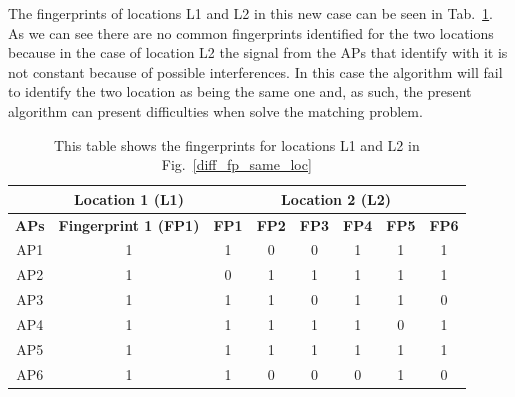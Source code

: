 The fingerprints of locations L1 and L2 in this new case can be seen in
Tab.~\ref{tab:table_fingerprints_same_loc}. As we can see there are no common
fingerprints identified for the two locations because in the case of location L2
the signal from the APs that identify with it is not constant because of
possible interferences. In this case the algorithm will fail to identify the two
location as being the same one and, as such, the present algorithm can present
difficulties when solve the matching problem.

\begin{table}[!h]
\begin{tabular}{|c|c|c|c|c|c|c|c|}
\hline
             & \textbf{Location 1 (L1)}     & \multicolumn{6}{c|}{\textbf{Location 2 (L2)}}                                           \\ \hline
\textbf{APs} & \textbf{Fingerprint 1 (FP1)} & \textbf{FP1} & \textbf{FP2} & \textbf{FP3} & \textbf{FP4} & \textbf{FP5} & \textbf{FP6} \\ \hline
AP1          & 1                            & 1            & 0            & 0            & 1            & 1            & 1            \\
AP2          & 1                            & 0            & 1            & 1            & 1            & 1            & 1            \\
AP3          & 1                            & 1            & 1            & 0            & 1            & 1            & 0            \\
AP4          & 1                            & 1            & 1            & 1            & 1            & 0            & 1            \\
AP5          & 1                            & 1            & 1            & 1            & 1            & 1            & 1            \\
AP6          & 1                            & 1            & 0            & 0            & 0            & 1            & 0            \\ \hline
\end{tabular}
\caption{This table shows the fingerprints for locations L1 and L2 in
Fig.~\ref{diff_fp_same_loc}}
\label{tab:table_fingerprints_same_loc}
\end{table}

